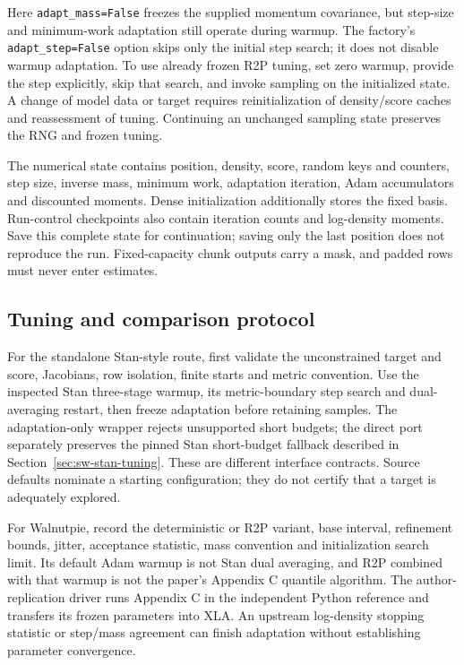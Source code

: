 Here \texttt{adapt\_mass=False} freezes the supplied momentum covariance,
but step-size and minimum-work adaptation still operate during warmup.
The factory's \texttt{adapt\_step=False} option skips only the initial
step search; it does not disable warmup adaptation. To use already frozen
R2P tuning, set zero warmup, provide the step explicitly, skip that search,
and invoke sampling on the initialized state. A change of model data or
target requires reinitialization of density/score caches and reassessment
of tuning. Continuing an unchanged sampling state preserves the RNG and
frozen tuning.

The numerical state contains position, density, score, random keys and
counters, step size, inverse mass, minimum work, adaptation iteration,
Adam accumulators and discounted moments. Dense initialization additionally
stores the fixed basis. Run-control checkpoints also contain iteration
counts and log-density moments. Save this complete state for continuation;
saving only the last position does not reproduce the run. Fixed-capacity
chunk outputs carry a mask, and padded rows must never enter estimates.

\subsection{Tuning and comparison protocol}

For the standalone Stan-style route, first validate the unconstrained
target and score, Jacobians, row isolation, finite starts and metric
convention. Use the inspected Stan three-stage warmup, its metric-boundary
step search and dual-averaging restart, then freeze adaptation before
retaining samples. The adaptation-only wrapper rejects unsupported short
budgets; the direct port separately preserves the pinned Stan short-budget
fallback described in Section~\ref{sec:sw-stan-tuning}. These are different
interface contracts. Source defaults nominate a starting configuration;
they do not certify that a target is adequately explored.

For Walnutpie, record the deterministic or R2P variant, base interval,
refinement bounds, jitter, acceptance statistic, mass convention and
initialization search limit. Its default Adam warmup is not Stan dual
averaging, and R2P combined with that warmup is not the paper's Appendix C
quantile algorithm. The author-replication driver runs Appendix C in the
independent Python reference and transfers its frozen parameters into XLA.
An upstream log-density stopping statistic or step/mass agreement can
finish adaptation without establishing parameter convergence.

